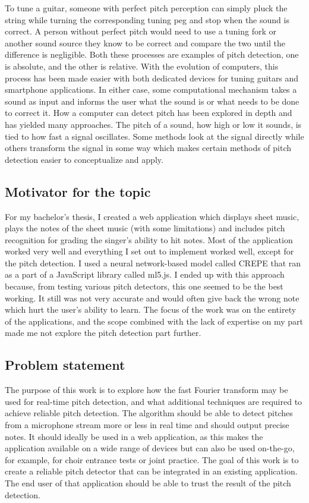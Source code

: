 To tune a guitar, someone with perfect pitch perception can simply pluck the string while turning the corresponding tuning peg and stop when the sound is correct. A person without perfect pitch would need to use a tuning fork or another sound source they know to be correct and compare the two until the difference is negligible. Both these processes are examples of pitch detection, one is absolute, and the other is relative. With the evolution of computers, this process has been made easier with both dedicated devices for tuning guitars and smartphone applications. In either case, some computational mechanism takes a sound as input and informs the user what the sound is or what needs to be done to correct it. How a computer can detect pitch has been explored in depth and has yielded many approaches. The pitch of a sound, how high or low it sounds, is tied to how fast a signal oscillates. Some methods look at the signal directly while others transform the signal in some way which makes certain methods of pitch detection easier to conceptualize and apply.

\subsection{Motivator for the topic}
For my bachelor's thesis, I created a web application which displays sheet music, plays the notes of the sheet music (with some limitations) and includes pitch recognition for grading the singer's ability to hit notes. Most of the application worked very well and everything I set out to implement worked well, except for the pitch detection. I used a neural network-based model called CREPE that ran as a part of a JavaScript library called ml5.js. I ended up with this approach because, from testing various pitch detectors, this one seemed to be the best working. It still was not very accurate and would often give back the wrong note which hurt the user's ability to learn. The focus of the work was on the entirety of the applications, and the scope combined with the lack of expertise on my part made me not explore the pitch detection part further.  

\subsection{Problem statement}
The purpose of this work is to explore how the fast Fourier transform may be used for real-time pitch detection, and what additional techniques are required to achieve reliable pitch detection. The algorithm should be able to detect pitches from a microphone stream more or less in real time and should output precise notes. It should ideally be used in a web application, as this makes the application available on a wide range of devices but can also be used on-the-go, for example, for choir entrance tests or joint practice. The goal of this work is to create a reliable pitch detector that can be integrated in an existing application. The end user of that application should be able to trust the result of the pitch detection. 
